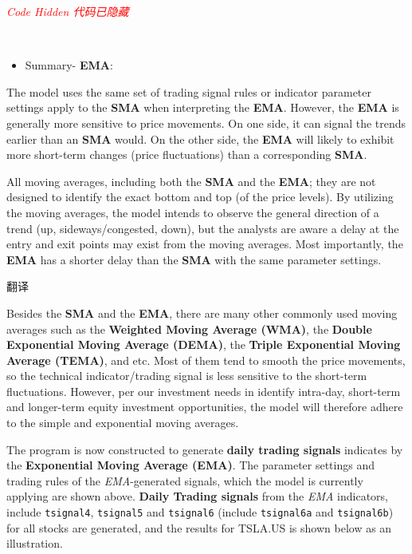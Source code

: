 \documentclass[
]{book}
\providecommand{\tightlist}{%
  \setlength{\itemsep}{0pt}\setlength{\parskip}{0pt}}
\begin{document}
\emph{\textcolor{red}{Code Hidden 代码已隐藏}}

~\\
\hspace*{0.333em}

\begin{itemize}
\tightlist
\item
  Summary- \textbf{EMA}:
\end{itemize}

The model uses the same set of trading signal rules or indicator
parameter settings apply to the \textbf{SMA} when interpreting the
\textbf{EMA}. However, the \textbf{EMA} is generally more sensitive to
price movements. On one side, it can signal the trends earlier than an
\textbf{SMA} would. On the other side, the \textbf{EMA} will likely to
exhibit more short-term changes (price fluctuations) than a
corresponding \textbf{SMA}.

All moving averages, including both the \textbf{SMA} and the
\textbf{EMA}; they are not designed to identify the exact bottom and top
(of the price levels). By utilizing the moving averages, the model
intends to observe the general direction of a trend (up,
sideways/congested, down), but the analysts are aware a delay at the
entry and exit points may exist from the moving averages. Most
importantly, the \textbf{EMA} has a shorter delay than the \textbf{SMA}
with the same parameter settings.

翻译

Besides the \textbf{SMA} and the \textbf{EMA}, there are many other
commonly used moving averages such as the \textbf{Weighted Moving
Average (WMA)}, the \textbf{Double Exponential Moving Average (DEMA)},
the \textbf{Triple Exponential Moving Average (TEMA)}, and etc. Most of
them tend to smooth the price movements, so the technical
indicator/trading signal is less sensitive to the short-term
fluctuations. However, per our investment needs in identify intra-day,
short-term and longer-term equity investment opportunities, the model
will therefore adhere to the simple and exponential moving averages.

The program is now constructed to generate \textbf{daily trading
signals} indicates by the \textbf{Exponential Moving Average (EMA)}. The
parameter settings and trading rules of the \emph{EMA}-generated
signals, which the model is currently applying are shown above.
\textbf{Daily Trading signals} from the \emph{EMA} indicators, include
\texttt{tsignal4}, \texttt{tsignal5} and \texttt{tsignal6} (include
\texttt{tsignal6a} and \texttt{tsignal6b}) for all stocks are generated,
and the results for TSLA.US is shown below as an illustration.
\end{document}

